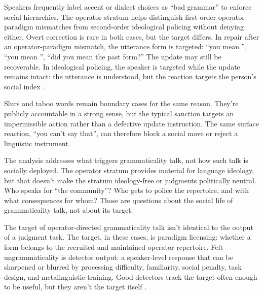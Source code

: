 \documentclass[12pt,letterpaper]{article}
\begin{document}
Speakers frequently label accent or dialect choices as \enquote{bad grammar} to enforce social hierarchies. The operator stratum helps distinguish first-order operator-paradigm mismatches from second-order ideological policing without denying either. Overt correction is rare in both cases, but the target differs. In repair after an operator-paradigm mismatch, the utterance form is targeted: \enquote{you mean }, \enquote{you mean }, \enquote{did you mean the past form?} The update may still be recoverable. In ideological policing, the speaker is targeted while the update remains intact: the utterance is understood, but the reaction targets the person's social index \citep{agha2007,eckert2012}.

Slurs and taboo words remain boundary cases for the same reason. They're publicly accountable in a strong sense, but the typical sanction targets an impermissible action rather than a defective update instruction. The same surface reaction, \enquote{you can't say that}, can therefore block a social move or reject a linguistic instrument.

The analysis addresses what triggers grammaticality talk, not how such talk is socially deployed. The operator stratum provides material for language ideology, but that doesn't make the stratum ideology-free or judgments politically neutral. Who speaks for \enquote{the community}? Who gets to police the repertoire, and with what consequences for whom? Those are questions about the social life of grammaticality talk, not about its target.

The target of operator-directed grammaticality talk isn't identical to the output of a judgment task. The target, in these cases, is paradigm licensing: whether a form belongs to the recruited and maintained operator repertoire. Felt ungrammaticality is detector output: a speaker-level response that can be sharpened or blurred by processing difficulty, familiarity, social penalty, task design, and metalinguistic training. Good detectors track the target often enough to be useful, but they aren't the target itself \citep{reynoldsmiller2026grammaticality}.
\end{document}
